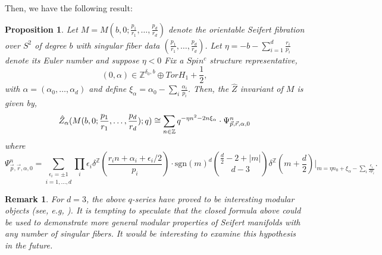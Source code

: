 \documentclass{article}
\newtheorem{proposition}{Proposition}[section]
\newtheorem{remark}{Remark}[section]
\numberwithin{corollary}{theorem}
\numberwithin{corollary}{proposition}
\begin{document}
Then, we have the following result: 
\begin{proposition}
    Let $M= M(b,0;\frac{p_1}{r_1},\ldots,\frac{p_d}{r_d})$ denote the orientable Seifert fibration over $S^2$ of degree $b$ with singular fiber data $(\frac{p_1}{r_1},\ldots,\frac{p_d}{r_d})$. Let $\eta = -b -\sum^d_{i=1}\frac{r_i}{p_i}$ denote its Euler number and suppose $\eta<0$ Fix a $Spin^c$ structure representative, $$(0,\alpha) \in \mathbb{Z}^{\delta_0,b}\oplus TorH_1+\frac{1}{2}, $$
    with $\alpha = (\alpha_0,\ldots,\alpha_d)$ and define $\xi_\alpha = \alpha_0 - \sum_i \frac{\alpha_i}{p_i}$. Then, the $\hat{Z}$ invariant of $M$ is given by, 
    $$\Hat{Z}_{\alpha}(M(b,0;\frac{p_1}{r_1},\ldots,\frac{p_d}{r_d});q) \cong \sum_{n\in \mathbb{Z}}q^{-\eta n^2 -2n \xi_\alpha} \cdot \Psi^n_{\Vec{p},\Vec{r},\alpha,0}$$
    where
    $$\Psi^n_{\Vec{p},\Vec{r},\alpha,0} = \underset{i=1,\ldots,d}{\sum_{\epsilon_i=\pm1}} \prod_i \epsilon_i \delta^\mathbb{Z}\left( \frac{r_i n +\alpha_i+\epsilon_i/2}{p_i}\right)\cdot \mathrm{sgn}(m)^d \binom{\frac{d}{2}-2+|m|}{d-3}\delta^\mathbb{Z}\left(m+\frac{d}{2}\right)\bigg|_{m = \eta n_0 + \xi_\alpha- \sum_i\frac{\epsilon_i}{2p_i}}.$$
\end{proposition}
\begin{remark}
    For $d=3$, the above $q$-series have proved to be interesting modular objects (see, e.g, \cite{3dmod}). It is tempting to speculate that the closed formula above could be used to demonstrate more general modular properties of Seifert manifolds with any number of singular fibers. It would be interesting to examine this hypothesis in the future.
\end{remark} 
\end{document}
